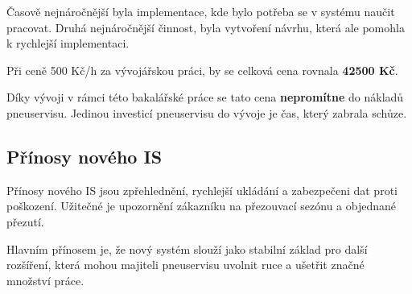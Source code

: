 Časově nejnáročnější byla implementace, kde bylo potřeba se v systému naučit pracovat. Druhá nejnáročnější činnost, byla vytvoření návrhu, která ale pomohla k rychlejší implementaci.

Při ceně 500 Kč/h za vývojářskou práci, by se celková cena rovnala \textbf{42500 Kč}. 

Díky vývoji v rámci této bakalářské práce se tato cena \textbf{nepromítne} do nákladů pneuservisu. Jedinou investicí pneuservisu do vývoje je čas, který zabrala schůze.
\subsection{Přínosy nového IS}
Přínosy nového IS jsou zpřehlednění, rychlejší ukládání a zabezpečeni dat proti poškození. Užitečné je upozornění zákazníku na přezouvací sezónu a objednané přezutí.

Hlavním přínosem je, že nový systém slouží jako stabilní základ pro další rozšíření, která mohou majiteli pneuservisu uvolnit ruce a ušetřit značné množství práce.
